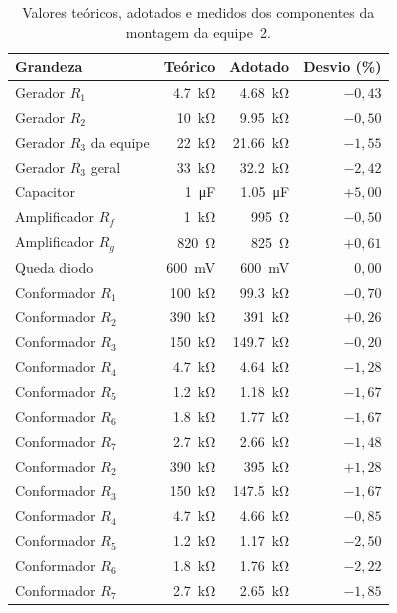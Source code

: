 \documentclass[11pt,a4paper]{article}
\begin{document}
\begin{table}[htbp]
\centering
\caption{Valores teóricos, adotados e medidos dos componentes da montagem da equipe~2.}
\label{tab:medidos_r6}
\begin{tabular}{@{}lrrr@{}}
\toprule
\textbf{Grandeza} & \textbf{Teórico} & \textbf{Adotado} & \textbf{Desvio (\%)} \\
\midrule
Gerador $R_1$ & \SI{4.7}{\kilo\ohm} & \SI{4.68}{\kilo\ohm} & $-0{,}43$ \\
Gerador $R_2$ & \SI{10}{\kilo\ohm} & \SI{9.95}{\kilo\ohm} & $-0{,}50$ \\
Gerador $R_3$ da equipe & \SI{22}{\kilo\ohm} & \SI{21.66}{\kilo\ohm} & $-1{,}55$ \\
Gerador $R_3$ geral & \SI{33}{\kilo\ohm} & \SI{32.2}{\kilo\ohm} & $-2{,}42$ \\
\addlinespace
Capacitor & \SI{1}{\micro\farad} & \SI{1.05}{\micro\farad} & $+5{,}00$ \\
\addlinespace
Amplificador $R_f$ & \SI{1}{\kilo\ohm} & \SI{995}{\ohm} & $-0{,}50$ \\
Amplificador $R_g$ & \SI{820}{\ohm} & \SI{825}{\ohm} & $+0{,}61$ \\
\addlinespace
Queda diodo & \SI{600}{\milli\volt} & \SI{600}{\milli\volt} & $0{,}00$ \\
\addlinespace
Conformador $R_1$ & \SI{100}{\kilo\ohm} & \SI{99.3}{\kilo\ohm} & $-0{,}70$ \\
Conformador $R_2$ & \SI{390}{\kilo\ohm} & \SI{391}{\kilo\ohm} & $+0{,}26$ \\
Conformador $R_3$ & \SI{150}{\kilo\ohm} & \SI{149.7}{\kilo\ohm} & $-0{,}20$ \\
Conformador $R_4$ & \SI{4.7}{\kilo\ohm} & \SI{4.64}{\kilo\ohm} & $-1{,}28$ \\
Conformador $R_5$ & \SI{1.2}{\kilo\ohm} & \SI{1.18}{\kilo\ohm} & $-1{,}67$ \\
Conformador $R_6$ & \SI{1.8}{\kilo\ohm} & \SI{1.77}{\kilo\ohm} & $-1{,}67$ \\
Conformador $R_7$ & \SI{2.7}{\kilo\ohm} & \SI{2.66}{\kilo\ohm} & $-1{,}48$ \\
\addlinespace
Conformador $R_2$ & \SI{390}{\kilo\ohm} & \SI{395}{\kilo\ohm} & $+1{,}28$ \\
Conformador $R_3$ & \SI{150}{\kilo\ohm} & \SI{147.5}{\kilo\ohm} & $-1{,}67$ \\
Conformador $R_4$ & \SI{4.7}{\kilo\ohm} & \SI{4.66}{\kilo\ohm} & $-0{,}85$ \\
Conformador $R_5$ & \SI{1.2}{\kilo\ohm} & \SI{1.17}{\kilo\ohm} & $-2{,}50$ \\
Conformador $R_6$ & \SI{1.8}{\kilo\ohm} & \SI{1.76}{\kilo\ohm} & $-2{,}22$ \\
Conformador $R_7$ & \SI{2.7}{\kilo\ohm} & \SI{2.65}{\kilo\ohm} & $-1{,}85$ \\
\bottomrule
\end{tabular}
\end{table}
\end{document}
